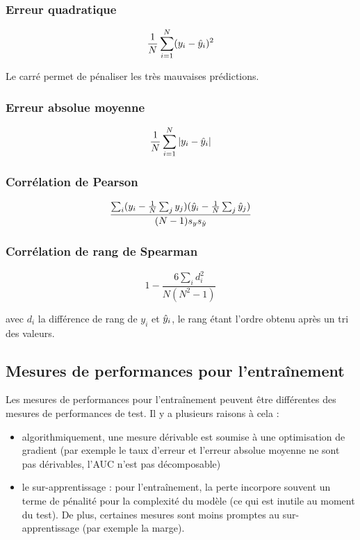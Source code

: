 		\subsubsection{Erreur quadratique}
		
		$$\frac{1}{N} \sum_{i = 1}^N (y_i - \hat{y}_i)^2$$
		
		Le carré permet de pénaliser les très mauvaises prédictions.
		
		\subsubsection{Erreur absolue moyenne}
		
		$$\frac{1}{N} \sum_{i = 1}^N \vert y_i - \hat{y}_i \vert$$
		
		\subsubsection{Corrélation de Pearson}
		
		$$\frac{\sum_i (y_i - \frac{1}{N} \sum_j y_j)(\hat{y}_i - \frac{1}{N} \sum_j \hat{y}_j)}{(N - 1)s_y s_{\hat{y}} }$$
		 		
		\subsubsection{Corrélation de rang de Spearman}
		
		$$1 - \frac{6 \sum_i d_i^2}{N(N^2 - 1)}$$
		
		avec $d_i$ la différence de rang de $y_i$ et $\hat{y}_i$, le rang étant l'ordre obtenu après un tri des valeurs.
		
	\subsection{Mesures de performances pour l'entraînement}
	
	Les mesures de performances pour l'entraînement peuvent être différentes des mesures de performances de test. Il y a plusieurs raisons à cela :
	
	\begin{itemize}
		\item algorithmiquement, une mesure dérivable est soumise à une optimisation de gradient (par exemple le taux d'erreur et l'erreur absolue moyenne ne sont pas dérivables, l'AUC n'est pas décomposable)
		\item le sur-apprentissage : pour l'entraînement, la perte incorpore souvent un terme de pénalité pour la complexité du modèle (ce qui est inutile au moment du test). De plus, certaines mesures sont moins promptes au sur-apprentissage (par exemple la marge).
	\end{itemize}
	